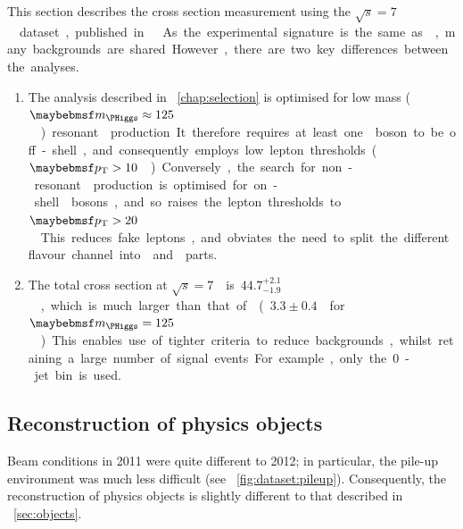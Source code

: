 
This section describes the \WW cross section measurement using the 
\unit{$\sqrt{s} = 7$}{\TeV} dataset, published in \Reference~\cite{WW-7TeV}.
As the experimental signature is the same as \HWW, many backgrounds are shared.
However, there are two key differences between the analyses. 

\begin{enumerate}
	\item The analysis described in \Chapter~\ref{chap:selection} is optimised for low 
	mass (\unit{$\mH \approx 125$}{\GeV}) resonant \WW production. It therefore requires 
	at least one \PW boson to be off-shell, and consequently employs low lepton 
	thresholds (\unit{$\pt > 10$}{\GeV}). Conversely, the search for non-resonant \WW 
	production is optimised for on-shell \PW bosons, and so raises the lepton thresholds 
	to \unit{$\pt > 20$}{\GeV}. This reduces fake leptons, and obviates the need to split 
	the different flavour channel into \emch and \mech parts.

	\item The total \WW cross section at \unit{$\sqrt{s} = 7$}{\TeV} is 
	\unit{$44.7^{+2.1}_{-1.9}$}{\pico\barn}, which is much larger than that of \ggHWW 
	(\unit{$3.3 \pm 0.4$}{\pico\barn} for \unit{$\mH = 125$}{\GeV}). This enables use of 
	tighter criteria to reduce backgrounds, whilst retaining a large number of signal 
	events. For example, only the 0-jet bin is used.
\end{enumerate}



\subsection{Reconstruction of physics objects}

Beam conditions in 2011 were quite different to 2012; in particular, the pile-up 
environment was much less difficult (see \Figure~\ref{fig:dataset:pileup}). Consequently, 
the reconstruction of physics objects is slightly different to that described in 
\Section~\ref{sec:objects}.

